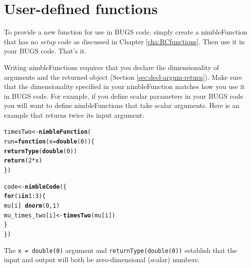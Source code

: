 \documentclass[12pt,oneside]{book}\usepackage[]{graphicx}\usepackage[]{color}
\makeatletter
\newcommand{\hlnum}[1]{\textcolor[rgb]{0.686,0.059,0.569}{#1}}%
\newcommand{\hlopt}[1]{\textcolor[rgb]{0,0,0}{#1}}%
\newcommand{\hlstd}[1]{\textcolor[rgb]{0.345,0.345,0.345}{#1}}%
\newcommand{\hlkwa}[1]{\textcolor[rgb]{0.161,0.373,0.58}{\textbf{#1}}}%
\newcommand{\hlkwb}[1]{\textcolor[rgb]{0.69,0.353,0.396}{#1}}%
\newcommand{\hlkwc}[1]{\textcolor[rgb]{0.333,0.667,0.333}{#1}}%
\newcommand{\hlkwd}[1]{\textcolor[rgb]{0.737,0.353,0.396}{\textbf{#1}}}%
\newenvironment{kframe}{%
 \def\at@end@of@kframe{}%
 \ifinner\ifhmode%
  \def\at@end@of@kframe{\end{minipage}}%
  \begin{minipage}{\columnwidth}%
 \fi\fi%
 \def\FrameCommand##1{\hskip\@totalleftmargin \hskip-\fboxsep
 \colorbox{shadecolor}{##1}\hskip-\fboxsep
     \hskip-\linewidth \hskip-\@totalleftmargin \hskip\columnwidth}%
 \MakeFramed {\advance\hsize-\width
   \@totalleftmargin\z@ \linewidth\hsize
   \@setminipage}}%
 {\par\unskip\endMakeFramed%
 \at@end@of@kframe}
\newenvironment{knitrout}{}{} %
\def\cd#1{\texttt{#1}}
\def\nm#1{\textit{#1}}
\makeatother
\begin{document}
\section{User-defined functions}
\label{sec:user-functions}

To provide a new function for use in BUGS code, simply create a nimbleFunction that has no \nm{setup} code as discussed in Chapter \ref{cha:RCfunctions}. Then use it in your BUGS code. That's it.

Writing nimbleFunctions requires that you declare the dimensionality of arguments and the returned object (Section \ref{sec:decl-argum-return}).  Make sure that the dimensionality specified in your nimbleFunction matches how you use it in BUGS code.  For example, if you define  scalar parameters in your BUGS code you will want to define nimbleFunctions that take scalar arguments.  Here is an example that returns twice its input argument:

\begin{knitrout}
\color{fgcolor}\begin{kframe}
\begin{alltt}
\hlstd{timesTwo} \hlkwb{<-} \hlkwd{nimbleFunction}\hlstd{(}
    \hlkwc{run} \hlstd{=} \hlkwa{function}\hlstd{(}\hlkwc{x} \hlstd{=} \hlkwd{double}\hlstd{(}\hlnum{0}\hlstd{)) \{}
        \hlkwd{returnType}\hlstd{(}\hlkwd{double}\hlstd{(}\hlnum{0}\hlstd{))}
        \hlkwd{return}\hlstd{(}\hlnum{2}\hlopt{*}\hlstd{x)}
    \hlstd{\})}

\hlstd{code} \hlkwb{<-} \hlkwd{nimbleCode}\hlstd{(\{}
    \hlkwa{for}\hlstd{(i} \hlkwa{in} \hlnum{1}\hlopt{:}\hlnum{3}\hlstd{) \{}
        \hlstd{mu[i]} \hlopt{~} \hlkwd{dnorm}\hlstd{(}\hlnum{0}\hlstd{,} \hlnum{1}\hlstd{)}
        \hlstd{mu_times_two[i]} \hlkwb{<-} \hlkwd{timesTwo}\hlstd{(mu[i])}
    \hlstd{\}}
\hlstd{\})}
\end{alltt}
\end{kframe}
\end{knitrout}
The \cd{x = double(0)} argument and \cd{returnType(double(0))}
establish that the input and output will both be zero-dimensional
(scalar) numbers.
\end{document}
